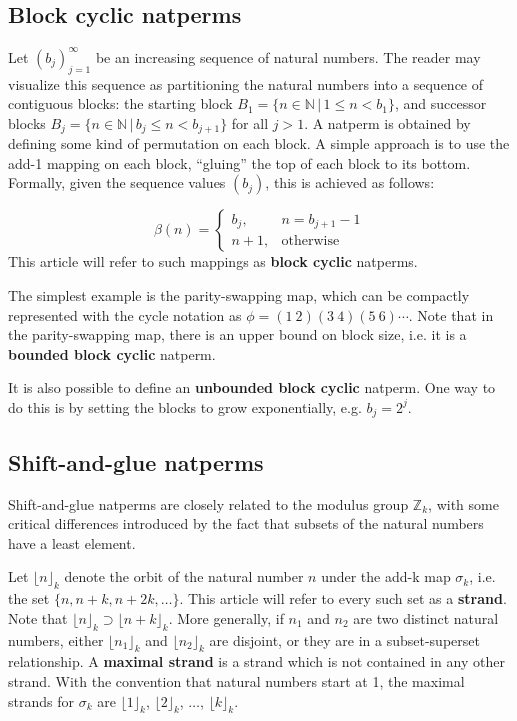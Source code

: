 \documentclass[12pt,reqno]{article}
\begin{document}
\subsection{Block cyclic natperms}

Let $(b_j)_{j=1}^{\infty}$ be an increasing sequence of natural numbers. The reader may visualize this sequence as partitioning the natural numbers into a sequence of contiguous blocks: the starting block $B_1 = \{ n \in \mathbb{N} \, | \, 1 \leq n < b_1 \}$, and successor blocks $B_j = \{ n \in \mathbb{N} \, | \, b_j \leq n < b_{j+1} \}$ for all $j > 1$. A natperm is obtained by defining some kind of permutation on each block. A simple approach is to use the add-1 mapping on each block, ``gluing'' the top of each block to its bottom. Formally, given the sequence values $(b_j)$, this is achieved as follows:

\begin{equation}
  \beta(n) = \begin{cases}
    b_j, & n = b_{j+1} - 1 \\
    n + 1, & \text{otherwise}
  \end{cases}
\end{equation}
This article will refer to such mappings as \textbf{block cyclic} natperms. 

The simplest example is the parity-swapping map, which can be compactly represented with the cycle notation as $\phi = (1 \ 2)(3 \ 4)(5 \ 6)\cdots$. Note that in the parity-swapping map, there is an upper bound on block size, i.e. it is a \textbf{bounded block cyclic} natperm.

It is also possible to define an \textbf{unbounded block cyclic} natperm. One way to do this is by setting the blocks to grow exponentially, e.g. $b_j = 2^j$.

\subsection{Shift-and-glue natperms}

Shift-and-glue natperms are closely related to the modulus group $\mathbb{Z}_k$, with some critical differences introduced by the fact that subsets of the natural numbers have a least element.

Let ${\lfloor n \rfloor}_k$ denote the orbit of the natural number $n$ under the add-k map $\sigma_k$, i.e. the set $\{ n, n + k, n + 2k, \ldots \}$. This article will refer to every such set as a \textbf{strand}. Note that ${\lfloor n \rfloor}_k \supset {\lfloor n + k \rfloor}_k$. More generally, if $n_1$ and $n_2$ are two distinct natural numbers, either ${\lfloor n_1 \rfloor}_k$ and ${\lfloor n_2 \rfloor}_k$ are disjoint, or they are in a subset-superset relationship. A \textbf{maximal strand} is a strand which is not contained in any other strand. With the convention that natural numbers start at 1, the maximal strands for $\sigma_k$ are ${\lfloor 1 \rfloor}_k$, ${\lfloor 2 \rfloor}_k$, $\ldots$, ${\lfloor k \rfloor}_k$. 
\end{document}
